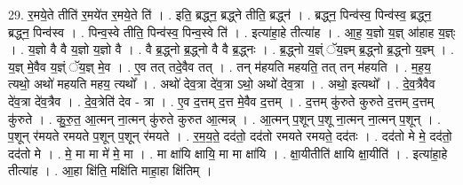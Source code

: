 \documentclass[17pt]{extarticle}
\begin{document}
29. र॒मये॒ते तीति॑ र॒मये॑त र॒मये॒ते ति॑ । . इति॒ ब्रद्ध्न॒ ब्रद्ध्ने तीति॒ ब्रद्ध्न॑ । . ब्रद्ध्न॒ पिन्व॑स्व॒ पिन्व॑स्व॒ ब्रद्ध्न॒ ब्रद्ध्न॒ पिन्व॑स्व । . पिन्व॒स्वे तीति॒ पिन्व॑स्व॒ पिन्व॒स्वे ति॑ । . इत्या॑हा॒हे तीत्या॑ह । . आ॒ह॒ य॒ज्ञो य॒ज्ञ् आ॑हाह य॒ज्ञ्ः । . य॒ज्ञो वै वै य॒ज्ञो य॒ज्ञो वै । . वै ब्र॒द्ध्नो ब्र॒द्ध्नो वै वै ब्र॒द्ध्नः । . ब्र॒द्ध्नो य॒ज्ञ्ं ॅय॒ज्ञ्म् ब्र॒द्ध्नो ब्र॒द्ध्नो य॒ज्ञ्म् । . य॒ज्ञ् मे॒वैव य॒ज्ञ्ं ॅय॒ज्ञ् मे॒व । . ए॒व तत् तदे॒वैव तत् । . तन् म॑हयति महयति॒ तत् तन् म॑हयति । . म॒ह॒य॒ त्यथो॒ अथो॑ महयति महय॒ त्यथो᳚ । . अथो॑ देव॒त्रा दे॑व॒त्रा ऽथो॒ अथो॑ देव॒त्रा । . अथो॒ इत्यथो᳚ । . दे॒व॒त्रैवैव दे॑व॒त्रा दे॑व॒त्रैव । . दे॒व॒त्रेति॑ देव - त्रा । . ए॒व द॒त्तम् द॒त्त मे॒वैव द॒त्तम् । . द॒त्तम् कु॑रुते कुरुते द॒त्तम् द॒त्तम् कु॑रुते । . कु॒रु॒त॒ आ॒त्मन् ना॒त्मन् कु॑रुते कुरुत आ॒त्मन्न् । . आ॒त्मन् प॒शून् प॒शू ना॒त्मन् ना॒त्मन् प॒शून् । . प॒शून् र॑मयते रमयते प॒शून् प॒शून् र॑मयते । . र॒म॒य॒ते॒ दद॑तो॒ दद॑तो रमयते रमयते॒ दद॑तः । . दद॑तो मे मे॒ दद॑तो॒ दद॑तो मे । . मे॒ मा मा मे॑ मे॒ मा । . मा क्षा॑यि क्षायि॒ मा मा क्षा॑यि । . क्षा॒यीतीति॑ क्षायि क्षा॒यीति॑ । . इत्या॑हा॒हे तीत्या॑ह । . आ॒हा क्षि॑ति॒ मक्षि॑ति माहा॒हा क्षि॑तिम् । \newline
\end{document}
